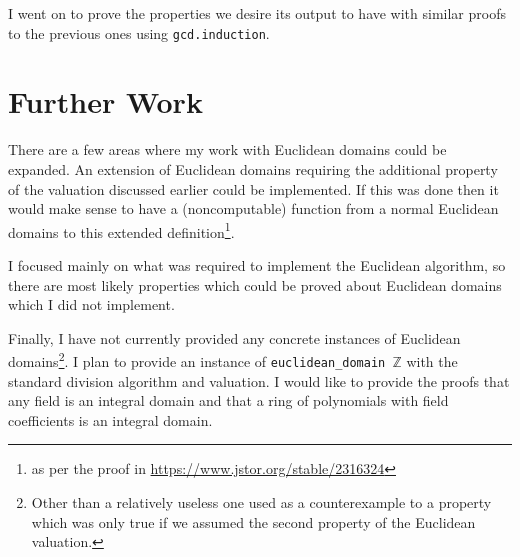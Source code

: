 \documentclass{article}
\newcommand{\Z}{\ensuremath{\mathbb{Z}}}
\newcommand{\ct}{\texttt}
\begin{document}
I went on to prove the properties we desire its output to have with similar proofs to the previous ones using \ct{gcd.induction}.

\section*{Further Work}
There are a few areas where my work with Euclidean domains could be expanded. An extension of Euclidean domains requiring the additional property of the valuation discussed earlier could be implemented. If this was done then it would make sense to have a (noncomputable) function from a normal Euclidean domains to this extended definition\footnote{as per the proof in \url{https://www.jstor.org/stable/2316324}}.

I focused mainly on what was required to implement the Euclidean algorithm, so there are most likely properties which could be proved about Euclidean domains which I did not implement.

Finally, I have not currently provided any concrete instances of Euclidean domains\footnote{Other than a relatively useless one used as a counterexample to a property which was only true if we assumed the second property of the Euclidean valuation.}.
I plan to provide an instance of \ct{euclidean\_domain $\Z$} with the standard division algorithm and valuation.
I would like to provide the proofs that any field is an integral domain and that a ring of polynomials with field coefficients is an integral domain.

\end{document}
